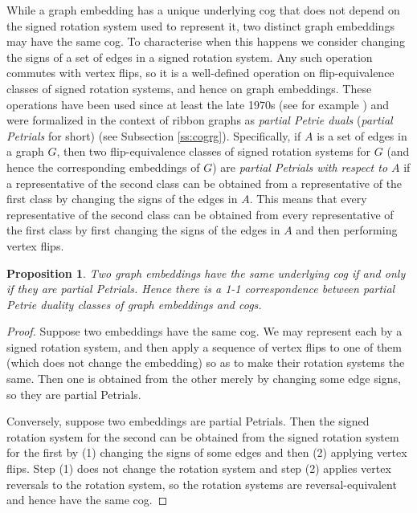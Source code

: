 \documentclass{amsart}
\newtheorem{proposition}[theorem]{Proposition}
\theoremstyle{definition}
\theoremstyle{remark}
\numberwithin{equation}{section}
\begin{document}
While a graph embedding has a unique underlying cog that does not depend on the signed rotation system used to represent it, two distinct graph embeddings may have the same cog.  To characterise when this happens we consider changing the signs of a set of edges in a signed rotation system.  Any such operation commutes with vertex flips, so it is a well-defined operation on flip-equivalence classes of signed rotation systems, and hence on graph embeddings.  These operations have been used since at least the late 1970s (see for example \cite{Sta78}) and were formalized in the context of ribbon graphs as \emph{partial Petrie duals} (\emph{partial Petrials} for short) \cite{MR2869185} (see Subsection \ref{ss:cogrg}).
Specifically, if $A$ is a set of edges in a graph $G$, then two flip-equivalence classes of signed rotation systems for $G$ (and hence the corresponding embeddings of $G$) are \emph{partial Petrials with respect to $A$} if a representative of the second class can be obtained from a representative of the first class by changing the signs of the edges in $A$.  This means that every representative of the second class can be obtained from every representative of the first class by first changing the signs of the edges in $A$ and then performing vertex flips.

\begin{proposition}\label{prop:ppcog}
Two graph embeddings have the same underlying cog if and only if they are partial Petrials.
Hence there is a 1-1 correspondence between partial Petrie duality classes of graph embeddings and cogs.
\end{proposition}


\begin{proof}
Suppose two embeddings have the same cog.  We may represent each by a signed rotation system, and then apply a sequence of vertex flips to one of them (which does not change the embedding) so as to make their rotation systems the same.  Then one is obtained from the other merely by changing some edge signs, so they are partial Petrials.

Conversely, suppose two embeddings are partial Petrials.  Then the signed rotation system for the second can be obtained from the signed rotation system for the first by (1) changing the signs of some edges and then (2) applying vertex flips.  Step (1) does not change the rotation system and step (2) applies vertex reversals to the rotation system, so the rotation systems are reversal-equivalent and hence have the same cog.
\end{proof}
\end{document}
